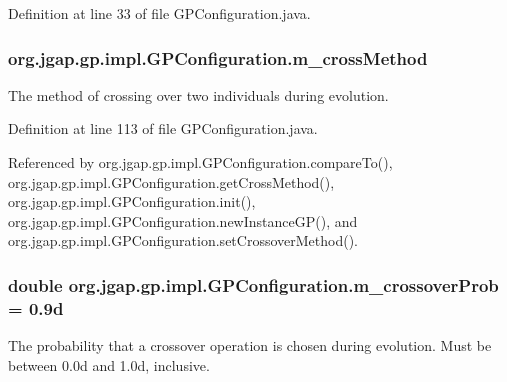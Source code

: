 Definition at line 33 of file G\-P\-Configuration.\-java.

\hypertarget{classorg_1_1jgap_1_1gp_1_1impl_1_1_g_p_configuration_af3059995753b01212b1ae28d9f7bf1e9}{
\subsubsection[{m\-\_\-cross\-Method}]{ org.\-jgap.\-gp.\-impl.\-G\-P\-Configuration.\-m\-\_\-cross\-Method\hspace{0.3cm}{\ttfamily [private]}}}\label{classorg_1_1jgap_1_1gp_1_1impl_1_1_g_p_configuration_af3059995753b01212b1ae28d9f7bf1e9}
The method of crossing over two individuals during evolution. 

Definition at line 113 of file G\-P\-Configuration.\-java.



Referenced by org.\-jgap.\-gp.\-impl.\-G\-P\-Configuration.\-compare\-To(), org.\-jgap.\-gp.\-impl.\-G\-P\-Configuration.\-get\-Cross\-Method(), org.\-jgap.\-gp.\-impl.\-G\-P\-Configuration.\-init(), org.\-jgap.\-gp.\-impl.\-G\-P\-Configuration.\-new\-Instance\-G\-P(), and org.\-jgap.\-gp.\-impl.\-G\-P\-Configuration.\-set\-Crossover\-Method().

\hypertarget{classorg_1_1jgap_1_1gp_1_1impl_1_1_g_p_configuration_a5473daf5ed501e61edad891f29507fed}{
\subsubsection[{m\-\_\-crossover\-Prob}]{\setlength{\rightskip}{0pt plus 5cm}double org.\-jgap.\-gp.\-impl.\-G\-P\-Configuration.\-m\-\_\-crossover\-Prob = 0.\-9d\hspace{0.3cm}{\ttfamily [private]}}}\label{classorg_1_1jgap_1_1gp_1_1impl_1_1_g_p_configuration_a5473daf5ed501e61edad891f29507fed}
The probability that a crossover operation is chosen during evolution. Must be between 0.\-0d and 1.\-0d, inclusive. 

